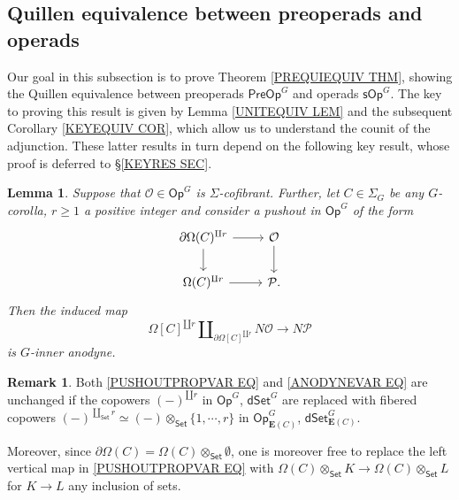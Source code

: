 \documentclass[a4paper,10pt
,draft
]{article}%
\numberwithin{equation}{section}
\numberwithin{figure}{section}
\newtheorem{lemma}[equation]{Lemma}%
\theoremstyle{definition} %
\newtheorem{remark}[equation]{Remark}%
\newcommand{\1}{\ensuremath{\mathbbm 1}}%
\begin{document}
\subsection{Quillen equivalence between preoperads and operads}


Our goal in this subsection is to prove
Theorem \ref{PREQUIEQUIV THM},
showing the Quillen equivalence between
preoperads $\mathsf{PreOp}^G$
and operads $\mathsf{sOp}^G$.
The key to proving this result is given by 
Lemma \ref{UNITEQUIV LEM}
and the subsequent
Corollary \ref{KEYEQUIV COR},
which allow us to understand the counit of the adjunction.
These latter results in turn depend on the following key 
result, whose proof is deferred to \S \ref{KEYRES SEC}.


\begin{lemma}\label{KEYPRVAR LEM}
	Suppose that $\mathcal{O} \in \mathsf{Op}^{G}$
	is $\Sigma$-cofibrant.
	Further, let $C \in \Sigma_G$ be any $G$-corolla,
	$r \geq 1$ a positive integer and consider 
	a pushout in $\mathsf{Op}^{G}$ of the form
\begin{equation}\label{PUSHOUTPROPVAR EQ}
	\begin{tikzcd}
	\partial \Omega(C)^{\amalg r} \ar{r} \ar{d} 
	& \mathcal{O} \ar{d}
\\
	\Omega(C)^{\amalg r} \ar{r} & \mathcal{P}.
	\end{tikzcd}
\end{equation}
	Then the induced map
\begin{equation}\label{ANODYNEVAR EQ}
	\Omega[C]^{\amalg r} 
	\amalg_{\partial \Omega[C]^{\amalg r}} N\mathcal{O} \to N\mathcal{P}
\end{equation}
	is $G$-inner anodyne.
\end{lemma}

\begin{remark}\label{KEYPRVAR REM}
	Both \eqref{PUSHOUTPROPVAR EQ} and \eqref{ANODYNEVAR EQ}
	are unchanged if the copowers $(-)^{\amalg r}$ in 
	$\mathsf{Op}^G$, $\mathsf{dSet}^G$
	are replaced with fibered copowers 
	$(-)^{\amalg_{\mathsf{Set}} r} \simeq 
	(-) \otimes_{\mathsf{Set}} \{1,\cdots,r\}$
	in 
	$\mathsf{Op}^G_{\boldsymbol{E}(C)}$,
	$\mathsf{dSet}^G_{\boldsymbol{E}(C)}$.
	
	Moreover, since 
	$\partial \Omega(C) = \Omega(C) \otimes_{\mathsf{Set}} \emptyset$,
	one is moreover free to replace
	the left vertical map in \eqref{PUSHOUTPROPVAR EQ}
	with 
	$\Omega(C) \otimes_{\mathsf{Set}} K
	\to
	\Omega(C) \otimes_{\mathsf{Set}} L$
	for $K\to L$ any inclusion of sets.
\end{remark}
\end{document}
